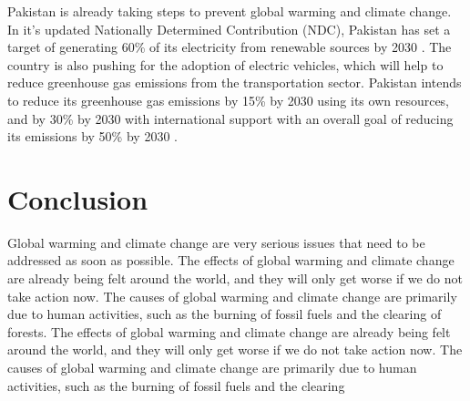 \documentclass{article}
\begin{document}
Pakistan is already taking steps to prevent global warming and climate change.
In it's updated Nationally Determined Contribution (NDC), Pakistan has set a
target of generating 60\% of its electricity from renewable sources by 2030
\cite{UNDP_Climate_Promise}. The country is also pushing for the adoption of
electric vehicles, which will help to reduce greenhouse gas emissions from the
transportation sector. Pakistan intends to reduce its greenhouse gas emissions
by 15\% by 2030 using its own resources, and by 30\% by 2030 with international
support with an overall goal of reducing its emissions by 50\% by 2030
\cite{UNDP_Climate_Promise}.

\section{Conclusion}
Global warming and climate change are very serious issues that need to be
addressed as soon as possible. The effects of global warming and climate change
are already being felt around the world, and they will only get worse if we do
not take action now. The causes of global warming and climate change are
primarily due to human activities, such as the burning of fossil fuels and the
clearing of forests. The effects of global warming and climate change are
already being felt around the world, and they will only get worse if we do not
take action now. The causes of global warming and climate change are primarily
due to human activities, such as the burning of fossil fuels and the clearing

\printbibliography
\end{document}
